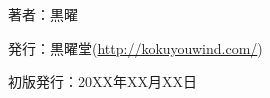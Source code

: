 \documentclass[index]{subfiles}
\begin{document}
\thispagestyle{empty}
\begin{flushright}
\begin{minipage}{0.6\hsize}
\begin{description}
  \item{著者：}黒曜
  \item{発行：}黒曜堂(\url{http://kokuyouwind.com/})
  \item{初版発行：}20XX年XX月XX日
\end{description}
\end{minipage}
\end{flushright}
\end{document}
